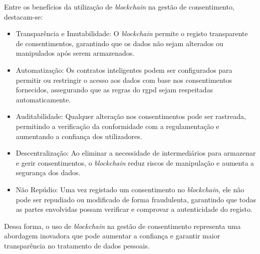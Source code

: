 Entre os benefícios da utilização de \textit{blockchain} na gestão de consentimento, destacam-se:

\begin{itemize}
    \item Transparência e Imutabilidade: O \textit{blockchain} permite o registo transparente de consentimentos, garantindo que os dados não sejam alterados ou manipulados após serem armazenados.
    \item Automatização: Os contratos inteligentes podem ser configurados para permitir ou restringir o acesso aos dados com base nos consentimentos fornecidos, assegurando que as regras do \acrshort{rgpd} sejam respeitadas automaticamente.
    \item Auditabilidade: Qualquer alteração nos consentimentos pode ser rastreada, permitindo a verificação da conformidade com a regulamentação e aumentando a confiança dos utilizadores.
    \item Descentralização: Ao eliminar a necessidade de intermediários para armazenar e gerir consentimentos, o \textit{blockchain} reduz riscos de manipulação e aumenta a segurança dos dados.
    \item Não Repúdio: Uma vez registado um consentimento no \textit{blockchain}, ele não pode ser repudiado ou modificado de forma fraudulenta, garantindo que todas as partes envolvidas possam verificar e comprovar a autenticidade do registo.
\end{itemize}

Dessa forma, o uso de \textit{blockchain} na gestão de consentimento representa uma abordagem inovadora que pode aumentar a confiança e garantir maior transparência no tratamento de dados pessoais.




